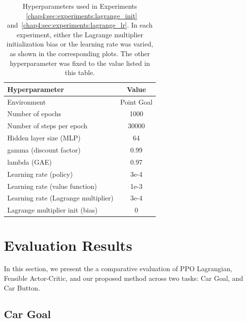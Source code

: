 \begin{table}[h]
  \centering
  \caption{Hyperparameters used in Experiments ~\ref{chap4:sec:experiments:lagrange_init} and~\ref{chap4:sec:experiments:lagrange_lr}. In each experiment, either the Lagrange multiplier initialization bias or the learning rate was varied, as shown in the corresponding plots. The other hyperparameter was fixed to the value listed in this table.}
  \label{tab:hyperparams-lagrange-init}
  \begin{tabular}{l c}
    \toprule
    \textbf{Hyperparameter} & \textbf{Value} \\
    \midrule
    Environment                         & Point Goal \\
    Number of epochs                    & 1000 \\
    Number of steps per epoch           & 30000 \\
    Hidden layer size (MLP)             & 64 \\
    gamma (discount factor)             & 0.99 \\
    lambda (GAE)                        & 0.97 \\
    Learning rate (policy)              & 3e-4 \\
    Learning rate (value function)      & 1e-3 \\
    Learning rate (Lagrange multiplier) & 3e-4 \\
    Lagrange multiplier init (bias)     & 0 \\
    \bottomrule
  \end{tabular}
\end{table}

\section{Evaluation Results}

In this section, we present the a comparative evaluation of PPO Lagrangian, Feasible Actor-Critic, and our proposed method across two tasks: Car Goal, and Car Button.

\subsection{Car Goal} \label{chap4:sec5:car_goal}

